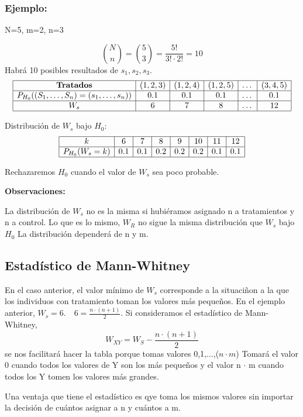 \subsubsection*{Ejemplo:}
N=5, m=2, n=3

\[
\binom{N}{n}=\binom{5}{3}=\frac{5!}{3!\cdot2!}=10
\]
Habrá 10 posibles resultados de $s_1,s_2,s_3$.
\[
\begin{array}{|c|c|c|c|c|c|}
\hline
\textbf{Tratados} & (1,2,3) & (1,2,4) & (1,2,5) & \dots & (3,4,5) \\ \hline
P_{H_0}((S_1, \dots, S_n) = (s_1, \dots, s_n)) & 0.1 & 0.1 & 0.1 & \dots & 0.1 \\ \hline
W_s & 6 &7 &8 & \dots &12 \\ \hline
\end{array}
\]

Distribución de \(W_s\) bajo \(H_0\):
\[
\begin{array}{|c|c|c|c|c|c|c|c|}
\hline
k & 6 & 7 & 8 & 9 & 10 & 11 & 12 \\ \hline
P_{H_0}(W_s = k) & 0.1 & 0.1 & 0.2 & 0.2 & 0.2 & 0.1 & 0.1 \\ \hline
\end{array}
\]

Rechazaremos $H_0$ cuando el valor de $W_s$ sea poco probable.

\textbf{Observaciones:}

La distribución de $W_s$ no es la misma si hubiéramos asignado n a tratamientos y n a control. Lo que es lo mismo, $W_R$ no sigue la misma distribución que $W_s$ bajo $H_0$
La distribución dependerá de n y m.

\subsection{Estadístico de Mann-Whitney}
En el caso anterior, el valor mínimo de $W_s$ corresponde a la situaciñon a la que los individuos con tratamiento toman los valores más pequeños.
En el ejemplo anterior, $W_s=6. \quad 6=\frac{n \cdot (n+1)}{2}$.
Si consideramos el estadístico de Mann-Whitney,
\[
W_{XY}=W_S- \frac{n \cdot (n+1)}{2}
\]
se nos facilitará hacer la tabla porque tomas valores 0,1,$\dots$,($n \cdot m$)
Tomará el valor 0 cuando todos los valores de Y son los más pequeños y el valor n $\cdot$ m  cuando todos los Y tomen los valores más grandes.

Una ventaja que tiene el estadístico es qye toma los mismos valores sin importar la decisión de cuántos asignar a n y cuántos a m.

